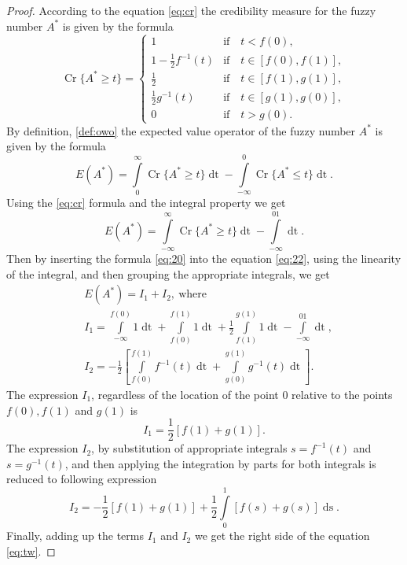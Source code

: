 \documentclass[review]{elsarticle}
\theoremstyle{definition}
\theoremstyle{theorem}
\DeclareMathOperator*{\ds}{ds}
\DeclareMathOperator*{\Cr}{Cr}
\DeclareMathOperator*{\dt}{dt}
\begin{document}
\begin{proof}
According to the equation \eqref{eq:cr} the credibility measure for the fuzzy number $A^*$ is given by the formula
\begin{equation}
\label{eq:20}
\Cr\{A^*\geq t\}=\left\{
\begin{array}{cl}
1 &\text{if}\quad t < f(0),\\
1-\frac{1}{2}f^{-1}(t)&\text{if}\quad t\in [f(0),f(1)],\\
\frac{1}{2} &\text{if}\quad t\in [f(1),g(1)],\\
\frac{1}{2}g^{-1}(t) &\text{if}\quad t\in [g(1),g(0)],\\
0 &\text{if}\quad t > g(0).
\end{array}
\right.
\end{equation}
By definition, \ref{def:owo} the expected value operator of the fuzzy number $ A^* $ is given by the formula
\begin{equation}
E(A^*)=\int\limits_0^{\infty}\Cr\{A^*\geq t\}\dt - \int\limits_{-\infty}^0\Cr\{A^*\leq t\}\dt.
\end{equation}
Using the \eqref{eq:cr} formula and the integral property we get
\begin{equation}
\label{eq:22}
E(A^*)=\int\limits_{-\infty}^{\infty}\Cr\{A^*\geq t\}\dt - \int\limits_{-\infty}^01\dt.
\end{equation}
Then by inserting the formula \eqref{eq:20} into the equation \eqref{eq:22}, using the linearity of the integral, and then grouping the appropriate integrals, we get
\begin{align}
&E(A^*)= I_1 + I_2,\ \text{where} \nonumber\\
&I_1 = \int\limits_{-\infty}^{f(0)}1\dt+\int\limits_{f(0)}^{f(1)}1\dt+\frac{1}{2}\int\limits_{f(1)}^{g(1)}1\dt-\int\limits_{-\infty}^01\dt,\\
&I_2 = -\frac{1}{2}\left[\int\limits_{f(0)}^{f(1)}f^{-1}(t)\dt+\int\limits_{g(0)}^{g(1)}g^{-1}(t)\dt \right].
\end{align}  
The expression $I_1$, regardless of the location of the point $0$ relative to the points $f(0), f(1)$ and $g(1) $ is
\begin{equation}
I_1=\frac{1}{2}[f(1)+g(1)].
\end{equation}
The expression $I_2$, by substitution of appropriate integrals $s=f^{-1}(t)$ and $ s=g^{-1}(t) $, and then applying the integration by parts for both integrals is reduced to following expression
\begin{equation}
I_2 = -\frac{1}{2}[f(1)+g(1)] + \frac{1}{2}\int\limits_0^1[f(s)+g(s)]\ds.
\end{equation}  
Finally, adding up the terms $I_1$ and $I_2$ we get the right side of the equation \eqref{eq:tw}.
\end{proof}
\end{document}

